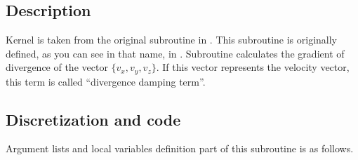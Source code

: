 \section{}

\subsection{Description}

Kernel  is taken from the original subroutine
 in \NICAM.
%
This subroutine is originally defined, as you can see in that name, in
.
%
Subroutine  calculates the gradient of divergence of
the vector $\{v_x, v_y, v_z\}$.
%
If this vector represents the velocity vector, this term is called
``divergence damping term''.


\subsection{Discretization and code}

Argument lists and local variables definition part of this subroutine is
as follows.

